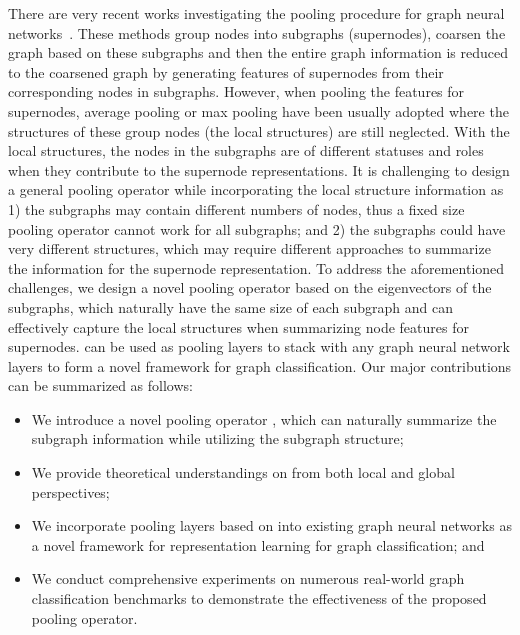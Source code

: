 \documentclass[sigconf]{acmart}
\begin{document}
 There are very recent works investigating the pooling procedure for graph neural networks~\cite{ying2018hierarchical,defferrard2016convolutional,fey2018splinecnn,simonovsky2017dynamic}. These methods group nodes into subgraphs (supernodes), coarsen the graph based on these subgraphs and then the entire graph information is reduced to the coarsened graph by generating features of supernodes from their corresponding nodes in subgraphs. However, when pooling the features for supernodes, average pooling or max pooling have been usually adopted where the structures of these group nodes (the local structures) are still neglected. With the local structures, the nodes in the subgraphs are of different statuses and roles when they contribute to the supernode representations. It is challenging to design a general pooling operator while incorporating the local structure information as 1) the subgraphs may contain different numbers of nodes, thus a fixed size pooling operator cannot work for all subgraphs; and 2) the subgraphs could have very different structures, which may require different approaches to summarize the information for the supernode representation. To address the aforementioned challenges, we design a novel pooling operator  based on the eigenvectors of the subgraphs, which naturally have the same size of each subgraph and can effectively capture the local structures when summarizing node features for supernodes.  can be used as pooling layers to stack with any graph neural network layers to form a novel framework  for graph classification. Our major contributions can be summarized as follows:
 
 \begin{itemize}
     \item We introduce a novel pooling operator , which can naturally summarize the subgraph information while utilizing the subgraph structure;
     \item We provide theoretical understandings on  from both local and global perspectives;
     \item We incorporate pooling layers based on  into existing graph neural networks as a novel framework  for representation learning for graph classification; and 
     \item We conduct comprehensive experiments on numerous real-world graph classification benchmarks to demonstrate the effectiveness of the proposed pooling operator.
 \end{itemize} 
 
\end{document}
